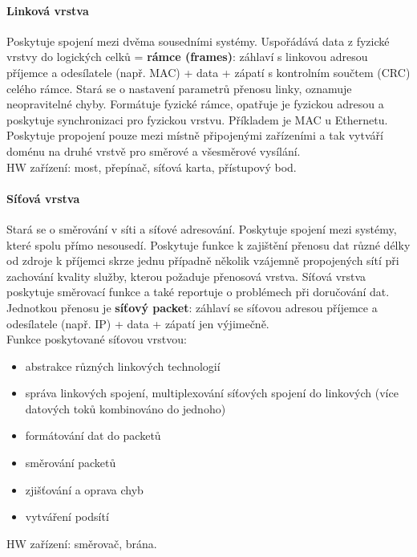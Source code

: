 \documentclass[10pt,a4paper]{article}
\begin{document}
\paragraph{Linková vrstva} Poskytuje spojení mezi dvěma sousedními systémy. Uspořádává data z fyzické vrstvy do logických celků = \textbf{rámce (frames)}: záhlaví s linkovou adresou příjemce a odesílatele (např. MAC) + data + zápatí s kontrolním součtem (CRC) celého rámce. Stará se o nastavení parametrů přenosu linky, oznamuje neopravitelné chyby. Formátuje fyzické rámce, opatřuje je fyzickou adresou a poskytuje synchronizaci pro fyzickou vrstvu. Příkladem je MAC u Ethernetu. Poskytuje propojení pouze mezi místně připojenými zařízeními a tak vytváří doménu na druhé vrstvě pro směrové a všesměrové vysílání. \\
HW zařízení: most, přepínač, síťová karta, přístupový bod.
\paragraph{Síťová vrstva} Stará se o směrování v síti a síťové adresování. Poskytuje spojení mezi systémy, které spolu přímo nesousedí. Poskytuje funkce k zajištění přenosu dat různé délky od zdroje k příjemci skrze jednu případně několik vzájemně propojených sítí při zachování kvality služby, kterou požaduje přenosová vrstva. Síťová vrstva poskytuje směrovací funkce a také reportuje o problémech při doručování dat. Jednotkou přenosu je \textbf{síťový packet}: záhlaví se síťovou adresou příjemce a odesílatele (např. IP) + data + zápatí jen výjimečně. \\
Funkce poskytované síťovou vrstvou:
\begin{itemize}
	\item abstrakce různých linkových technologií
	\item správa linkových spojení, multiplexování síťových spojení do linkových (více datových toků kombinováno do jednoho)
	\item formátování dat do packetů
	\item směrování packetů
	\item zjišťování a oprava chyb
	\item vytváření podsítí
\end{itemize}
HW zařízení: směrovač, brána.
\end{document}
